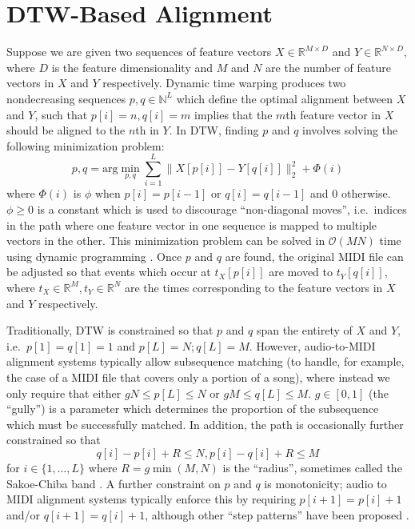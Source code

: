 \documentclass{article}
\begin{document}
\section{DTW-Based Alignment}
\label{sec:dtw}

Suppose we are given two sequences of feature vectors $X \in \mathbb{R}^{M \times D}$ and $Y \in \mathbb{R}^{N \times D}$, where $D$ is the feature dimensionality and $M$ and $N$ are the number of feature vectors in $X$ and $Y$ respectively.
Dynamic time warping produces two nondecreasing sequences $p, q \in \mathbb{N}^L$ which define the optimal alignment between $X$ and $Y$, such that $p[i] = n, q[i] = m$ implies that the $m$th feature vector in $X$ should be aligned to the $n$th in $Y$.
In DTW, finding $p$ and $q$ involves solving the following minimization problem:
$$
p, q = \mathrm{arg}\min_{p, q} \sum_{i = 1}^{L} \|X[p[i]] - Y[q[i]]\|_2^2 + \Phi(i)
$$
where $\Phi(i)$ is $\phi$ when $p[i] = p[i - 1]$ or $q[i] = q[i - 1]$ and $0$ otherwise.
$\phi \ge 0$ is a constant which is used to discourage ``non-diagonal moves'', i.e.\ indices in the path where one feature vector in one sequence is mapped to multiple vectors in the other.
This minimization problem can be solved in $\mathcal{O}(MN)$ time using dynamic programming \cite{sakoe1978dynamic}.
Once $p$ and $q$ are found, the original MIDI file can be adjusted so that events which occur at $t_X[p[i]]$ are moved to $t_Y[q[i]]$, where $t_X \in \mathbb{R}^M, t_Y \in \mathbb{R}^N$ are the times corresponding to the feature vectors in $X$ and $Y$ respectively.

Traditionally, DTW is constrained so that $p$ and $q$ span the entirety of $X$ and $Y$, i.e.\ $p[1] = q[1] = 1$ and $p[L] = N; q[L] = M$.
However, audio-to-MIDI alignment systems typically allow subsequence matching (to handle, for example, the case of a MIDI file that covers only a portion of a song), where instead we only require that either $gN \le p[L] \le N$ or $gM \le q[L] \le M$.
$g \in [0, 1]$ (the ``gully'') is a parameter which determines the proportion of the subsequence which must be successfully matched.
In addition, the path is occasionally further constrained so that
$$
q[i] - p[i] + R \le N, p[i] - q[i] + R \le M
$$
for $i \in \{1, \ldots, L\}$ where $R = g\min(M, N)$ is the ``radius'', sometimes called the Sakoe-Chiba band \cite{sakoe1978dynamic}.
A further constraint on $p$ and $q$ is monotonicity; audio to MIDI alignment systems typically enforce this by requiring $p[i + 1] = p[i] + 1$ and/or $q[i + 1] = q[i] + 1$, although other ``step patterns'' have been proposed \cite{muller2007dynamic, sakoe1978dynamic}.
\end{document}
